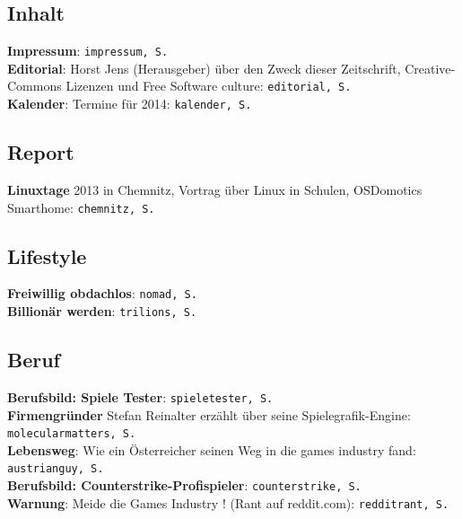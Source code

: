 \documentclass[10pt,a4paper,ngerman,twoside]{article} %
\newcommand{\NewsItem}[1]{ %
\usefont{T1}{fvs}{n}{n} %
\vspace{24pt}\large #1\vspace{3pt} %
\par \normalsize \normalfont}
\begin{document}
\begin{multicols}{3}
\NewsItem{}
\section*{Inhalt} 
\label{inhalt}

\textbf{Impressum}: \texttt{impressum, S. \pageref{impressum}}\\
\textbf{Editorial}: Horst Jens (Herausgeber) über den Zweck dieser Zeitschrift, Creative-Commons Lizenzen und Free Software culture: \texttt{editorial, S. \pageref{editorial}}\\ 
\textbf{Kalender}: Termine für 2014: \texttt{kalender, S. \pageref{kalender}}

\subsection*{Report}

\textbf{Linuxtage} 2013 in Chemnitz, Vortrag über Linux in Schulen, OSDomotics Smarthome: \texttt{chemnitz, S. \pageref{chemnitz}}\\

\subsection*{Lifestyle}

\textbf{Freiwillig obdachlos}: \texttt{nomad, S. \pageref{nomad}}\\
\textbf{Billionär werden}: \texttt{trilions, S. \pageref{trillions}}\\

\subsection*{Beruf}

\textbf{Berufsbild: Spiele Tester}: \texttt{spieletester, S. \pageref{spieletester}}\\
\textbf{Firmengründer} Stefan Reinalter erzählt über seine Spielegrafik-Engine: \texttt{molecularmatters, S. \pageref{molecularmatters}}\\
\textbf{Lebensweg}: Wie ein Österreicher seinen Weg in die games industry fand: \texttt{austrianguy, S. \pageref{austrianguy}}\\
\textbf{Berufsbild: Counterstrike-Profispieler}: \texttt{counterstrike, S. \pageref{counterstrike}}\\
\textbf{Warnung}: Meide die Games Industry ! (Rant auf reddit.com): \texttt{redditrant, S. \pageref{redditrant}}\\


\end{multicols}
\end{document}
